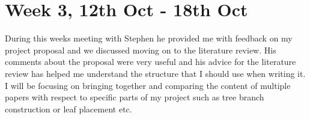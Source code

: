\documentclass[12pt]{article}
\begin{document}
\section*{Week 3, 12th Oct - 18th Oct}
During this weeks meeting with Stephen he provided me with feedback on my project 
proposal and we discussed moving on to the literature review. His comments about the 
proposal were very useful and his advice for the literature review has helped me 
understand the structure that I should use when writing it. I will be focusing on 
bringing together and comparing the content of multiple papers with respect to specific 
parts of my project such as tree branch construction or leaf placement etc.
\end{document}
